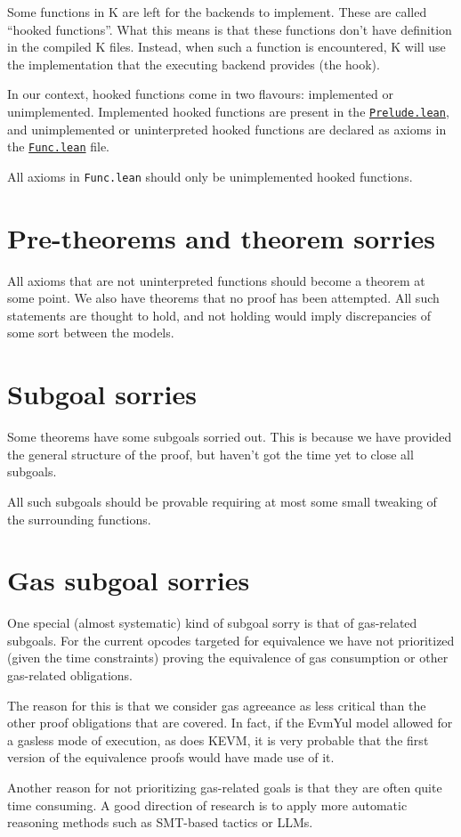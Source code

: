 Some functions in K are left for the backends to implement. These are called
``hooked functions''. What this means is that these functions don't have
definition in the compiled K files. Instead, when such a function is
encountered, K will use the implementation that the executing backend provides
(the hook).

In our context, hooked functions come in two flavours: implemented or
unimplemented. Implemented hooked functions are present in the
\href{https://runtimeverification.github.io/evm-equivalence/docs/EvmEquivalence/KEVM2Lean/Prelude.html}{\texttt{Prelude.lean}},
and unimplemented or uninterpreted hooked functions are declared as axioms in
the
\href{https://runtimeverification.github.io/evm-equivalence/docs/EvmEquivalence/KEVM2Lean/Func.html}{\texttt{Func.lean}}
file.

All axioms in \texttt{Func.lean} should only be unimplemented hooked functions.

\section{Pre-theorems and theorem sorries}

All axioms that are not uninterpreted functions should become a theorem at some
point. We also have theorems that no proof has been attempted. All such
statements are thought to hold, and not holding would imply discrepancies of
some sort between the models.

\section{Subgoal sorries}

Some theorems have some subgoals sorried out. This is because we have
provided the general structure of the proof, but haven't got the time yet to
close all subgoals.

All such subgoals should be provable requiring at most some small tweaking of
the surrounding functions.

\section{Gas subgoal sorries}

One special (almost systematic) kind of subgoal sorry is that of gas-related subgoals.
For the current opcodes targeted for equivalence we have not prioritized (given the time constraints) proving the equivalence of gas consumption or other gas-related obligations.

The reason for this is that we consider gas agreeance as less critical than the other proof obligations that are covered.
In fact, if the EvmYul model allowed for a gasless mode of execution, as does KEVM, it is very probable that the first version of the equivalence proofs would have made use of it.

Another reason for not prioritizing gas-related goals is that they are often quite time consuming. A good direction of research is to apply more automatic reasoning methods such as SMT-based tactics or LLMs.
